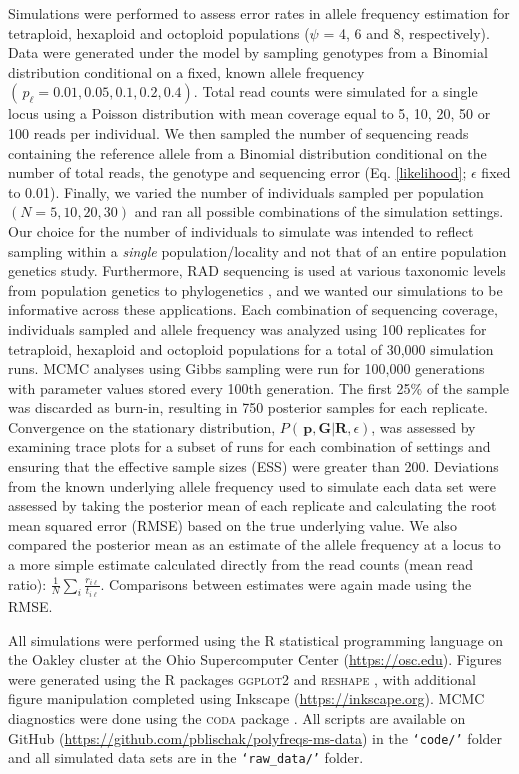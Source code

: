 \documentclass[11pt,english,letterpaper,oneside]{article}
\begin{document}
Simulations were performed to assess error rates in allele frequency estimation for tetraploid, hexaploid and octoploid populations ($\psi$ = 4, 6 and 8, respectively). Data were generated under the model by sampling genotypes from a Binomial distribution conditional on a fixed, known allele frequency $(\,p_{\ell} = 0.01, 0.05, 0.1, 0.2, 0.4)$. Total read counts were simulated for a single locus using a Poisson distribution with mean coverage equal to 5, 10, 20, 50 or 100 reads per individual. We then sampled the number of sequencing reads containing the reference allele from a Binomial distribution conditional on the number of total reads, the genotype and sequencing error (Eq. \ref{likelihood}; $\epsilon$ fixed to 0.01). Finally, we varied the number of individuals sampled per population $(N = 5, 10, 20, 30)$ and ran all possible combinations of the simulation settings. Our choice for the number of individuals to simulate was intended to reflect sampling within a \textit{single} population/locality and not that of an entire population genetics study. Furthermore, RAD sequencing is used at various taxonomic levels from population genetics to phylogenetics \citep[e.g.,][]{rheindt2013zimmerius,eaton2015oaks}, and we wanted our simulations to be informative across these applications. Each combination of sequencing coverage, individuals sampled and allele frequency was analyzed using 100 replicates for tetraploid, hexaploid and octoploid populations for a total of  30,000 simulation runs. MCMC analyses using Gibbs sampling were run for 100,000 generations with parameter values stored every 100th generation. The first 25\% of the sample was discarded as burn-in, resulting in 750 posterior samples for each replicate. Convergence on the stationary distribution, $P(\,\bm{p},\bm{G}|\bm{R},\epsilon)$, was assessed by examining trace plots for a subset of runs for each combination of settings and ensuring that the effective sample sizes (ESS) were greater than 200. Deviations from the known underlying allele frequency used to simulate each data set were assessed by taking the posterior mean of each replicate and calculating the root mean squared error (RMSE) based on the true underlying value. We also compared the posterior mean as an estimate of the allele frequency at a locus to a more simple estimate calculated directly from the read counts (mean read ratio): $\frac{1}{N}\sum_i\frac{r_{i\ell}}{t_{i\ell}}$. Comparisons between estimates were again made using the RMSE.
\medskip

All simulations were performed using the R statistical programming language \citep{r2014} on the Oakley cluster at the Ohio Supercomputer Center (\url{https://osc.edu}). Figures were generated using the R packages \textsc{ggplot2} \citep{wickham2009ggplot2} and \textsc{reshape} \citep{wickham2007reshape}, with additional figure manipulation completed using Inkscape (\url{https://inkscape.org}). MCMC diagnostics were done using the \textsc{coda} package \citep{plummer2006coda}. All scripts are available on GitHub (\url{https://github.com/pblischak/polyfreqs-ms-data}) in the \texttt{`code/'} folder and all simulated data sets are in the \texttt{`raw\_data/'} folder.
\medskip
\end{document}
